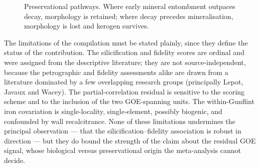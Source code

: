 \documentclass[11pt]{article}
\begin{document}
\begin{figure}[t]
\centering
{}
\caption{Preservational pathways. Where early mineral entombment outpaces decay, morphology is
retained; where decay precedes mineralisation, morphology is lost and kerogen survives.}
\label{fig:model}
\end{figure}

The limitations of the compilation must be stated plainly, since they define the status of the
contribution. The silicification and fidelity scores are ordinal and were assigned from the
descriptive literature; they are not source-independent, because the petrographic and fidelity
assessments alike are drawn from a literature dominated by a few overlapping research groups
(principally Lepot, Javaux and Wacey). The partial-correlation residual is sensitive to the scoring
scheme and to the inclusion of the two GOE-spanning units. The within-Gunflint iron covariation is
single-locality, single-element, possibly biogenic, and confounded by wall recalcitrance. None of
these limitations undermines the principal observation --- that the silicification--fidelity
association is robust in direction --- but they do bound the strength of the claim about the residual
GOE signal, whose biological
versus preservational origin the meta-analysis cannot decide.
\end{document}

